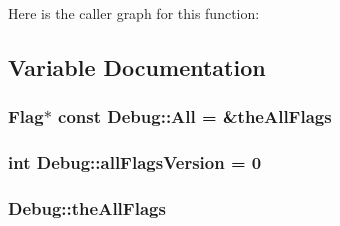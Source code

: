Here is the caller graph for this function:




\subsection{Variable Documentation}
\hypertarget{namespaceDebug_abe73cacba918a5c088ae708162e0cfe2}{
\subsubsection[{All}]{\setlength{\rightskip}{0pt plus 5cm}Flag$\ast$ const {\bf Debug::All} = \&{\bf theAllFlags}}}
\label{namespaceDebug_abe73cacba918a5c088ae708162e0cfe2}
\hypertarget{namespaceDebug_a6eec1fa1c405c62968ca11295758d429}{
\subsubsection[{allFlagsVersion}]{\setlength{\rightskip}{0pt plus 5cm}int {\bf Debug::allFlagsVersion} = 0}}
\label{namespaceDebug_a6eec1fa1c405c62968ca11295758d429}
\hypertarget{namespaceDebug_ac230a2b949dcfde863ac34d10d5b92ea}{
\subsubsection[{theAllFlags}]{ {\bf Debug::theAllFlags}}}
\label{namespaceDebug_ac230a2b949dcfde863ac34d10d5b92ea}
